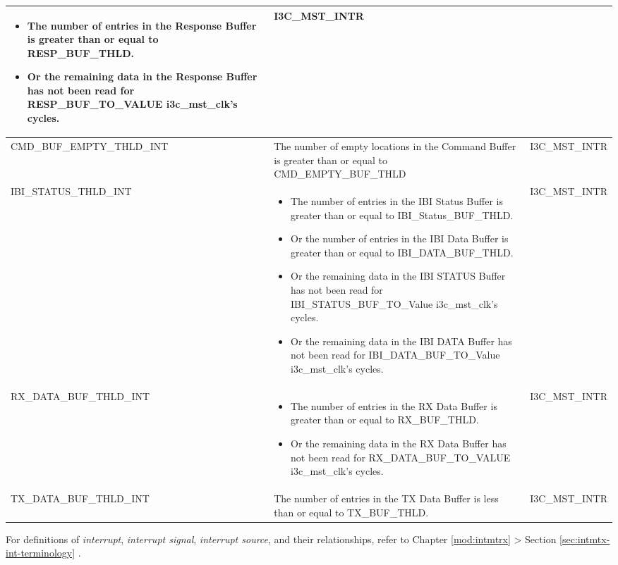 \documentclass[main\_\_EN.tex]{subfiles}
\begin{document}
\begin{longtable}{ | L{4.5cm} | L{8.5cm} | L{2.5cm} | }
\begin{itemize}
    \item The number of entries in the Response Buffer is greater than or equal to RESP\_BUF\_THLD.
    \item Or the remaining data in the Response Buffer has not been read for RESP\_BUF\_TO\_VALUE i3c\_mst\_clk's cycles.
\end{itemize}   & I3C\_MST\_INTR \\ \hline
\label{int:CMDBUFEMPTYTHLDINT}CMD\_BUF\_EMPTY\_THLD\_INT &  The number of empty locations in the Command Buffer is greater than or equal to CMD\_EMPTY\_BUF\_THLD  & I3C\_MST\_INTR \\ \hline
\label{int:IBISTATUSTHLDINT}IBI\_STATUS\_THLD\_INT & \begin{itemize}
    \item The number of entries in the IBI Status Buffer is greater than or equal to IBI\_Status\_BUF\_THLD.
    \item Or the number of entries in the IBI Data Buffer is greater than or equal to IBI\_DATA\_BUF\_THLD.
    \item Or the remaining data in the IBI STATUS Buffer has not been read for IBI\_STATUS\_BUF\_TO\_Value i3c\_mst\_clk's cycles.
    \item Or the remaining data in the IBI DATA Buffer has not been read for IBI\_DATA\_BUF\_TO\_Value i3c\_mst\_clk's cycles.
\end{itemize}
   & I3C\_MST\_INTR \\ \hline
\label{int:RXDATABUFTHLDINT}RX\_DATA\_BUF\_THLD\_INT &  \begin{itemize}
    \item The number of entries in the RX Data Buffer is greater than or equal to RX\_BUF\_THLD.
    \item Or the remaining data in the RX Data Buffer has not been read for RX\_DATA\_BUF\_TO\_VALUE i3c\_mst\_clk's cycles.
\end{itemize}   & I3C\_MST\_INTR \\ \hline
\label{int:TXDATABUFTHLDINT}TX\_DATA\_BUF\_THLD\_INT & The number of entries in the TX Data Buffer is less than or equal to TX\_BUF\_THLD. & I3C\_MST\_INTR \\ \hline

\end{longtable}
\begin{tiplisting}
For definitions of \textit{interrupt}, \textit{interrupt signal}, \textit{interrupt source}, and their relationships, refer to Chapter \ref{mod:intmtrx} \textit{} > Section \ref{sec:intmtx-int-terminology} \textit{}.
\end{tiplisting}
\end{document}
